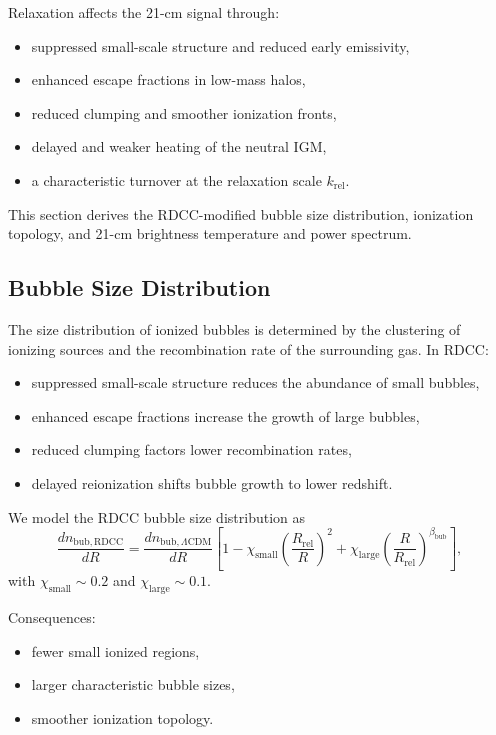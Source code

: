 \documentclass[11pt,a4paper]{article}
\begin{document}
Relaxation affects the 21-cm signal through:
\begin{itemize}
\item suppressed small-scale structure and reduced early emissivity,
\item enhanced escape fractions in low-mass halos,
\item reduced clumping and smoother ionization fronts,
\item delayed and weaker heating of the neutral IGM,
\item a characteristic turnover at the relaxation scale $k_{\mathrm{rel}}$.
\end{itemize}

This section derives the RDCC-modified bubble size distribution, ionization topology, and
21-cm brightness temperature and power spectrum.

\subsection{Bubble Size Distribution}

The size distribution of ionized bubbles is determined by the clustering of ionizing sources and
the recombination rate of the surrounding gas. In RDCC:
\begin{itemize}
\item suppressed small-scale structure reduces the abundance of small bubbles,
\item enhanced escape fractions increase the growth of large bubbles,
\item reduced clumping factors lower recombination rates,
\item delayed reionization shifts bubble growth to lower redshift.
\end{itemize}

We model the RDCC bubble size distribution as
\begin{equation}
\frac{dn_{\mathrm{bub,RDCC}}}{dR}
=
\frac{dn_{\mathrm{bub},\Lambda\mathrm{CDM}}}{dR}
\left[
1
-
\chi_{\mathrm{small}}
\left(
\frac{R_{\mathrm{rel}}}{R}
\right)^{2}
+
\chi_{\mathrm{large}}
\left(
\frac{R}{R_{\mathrm{rel}}}
\right)^{\beta_{\mathrm{bub}}}
\right],
\end{equation}
with $\chi_{\mathrm{small}} \sim 0.2$ and $\chi_{\mathrm{large}} \sim 0.1$.

Consequences:
\begin{itemize}
\item fewer small ionized regions,
\item larger characteristic bubble sizes,
\item smoother ionization topology.
\end{itemize}
\end{document}
